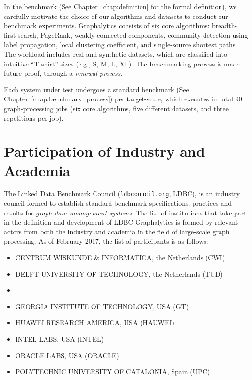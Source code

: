 In the benchmark (See Chapter~\ref{chap:definition} for the formal definition), we carefully motivate the choice of our algorithms and datasets to conduct our benchmark experiments. Graphalytics consists of six core algorithms: breadth-first search, PageRank, weakly connected components, community detection using label propagation, local clustering coefficient, and single-source shortest paths. The workload includes real and synthetic datasets, which are classified into intuitive ``T-shirt'' sizes (e.g., S, M, L, XL). The benchmarking process is made future-proof, through a {\it renewal process}. 

Each system under test undergoes a standard benchmark (See Chapter~\ref{chap:benchmark_process}) per target-scale, which executes in total 90 graph-processing jobs (six core algorithms, five different datasets, and three repetitions per job).


\section{Participation of Industry and Academia}
The Linked Data Benchmark Council ({\footnotesize\tt ldbcouncil.org}, LDBC), is an industry council formed to 
establish standard benchmark specifications, practices and results for {\em graph data management systems}. The list of institutions that take part in the definition and development of LDBC-Graphalytics is formed by relevant actors from both the industry and academia in the field of large-scale graph processing. As of February 2017, the list of participants is as follows:

\begin{itemize}
	\item \MakeUppercase{Centrum Wiskunde \& Informatica}, the Netherlands (CWI)
	\item \MakeUppercase{Delft University of Technology}, the Netherlands (TUD)
	\item {}
	\item \MakeUppercase{Georgia Institute of Technology}, USA (GT)
	\item \MakeUppercase{Huawei Research America}, USA (HAUWEI)
	\item \MakeUppercase{Intel Labs}, USA (INTEL)
	\item \MakeUppercase{Oracle Labs}, USA (ORACLE)
	\item \MakeUppercase{Polytechnic University of Catalonia}, Spain (UPC)
\end{itemize}